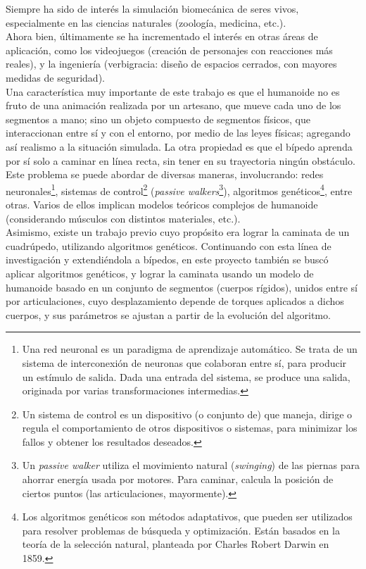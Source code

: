 \documentclass{article}
\begin{document}
Siempre ha sido de inter\'es la simulaci\'on biomec\'anica de seres vivos, especialmente en las ciencias naturales (zoolog\'ia, medicina, etc.). \\
Ahora bien, \'ultimamente se ha incrementado el inter\'es en otras \'areas de aplicaci\'on, como los videojuegos (creaci\'on de personajes con reacciones m\'as reales), y la ingenier\'ia (verbigracia: dise\~no de espacios cerrados, con mayores medidas de seguridad).\\
Una caracter\'istica muy importante de este trabajo es que el humanoide no es fruto de una animaci\'on realizada por un artesano, que mueve cada uno de los segmentos a mano; sino un objeto compuesto de segmentos f\'isicos, que interaccionan entre s\'i y con el entorno, por medio de las leyes f\'isicas; agregando as\'i realismo a la situaci\'on simulada.  La otra propiedad es que el b\'ipedo aprenda por s\'i solo a caminar en l\'inea recta, sin tener en su trayectoria ning\'un obst\'aculo.\\
Este problema se puede abordar de diversas maneras, involucrando: redes neuronales\footnote{Una red neuronal es un paradigma de aprendizaje autom\'atico. Se trata de un sistema de interconexi\'on de neuronas que colaboran entre s\'i, para producir un est\'imulo de salida. Dada una entrada del sistema, se produce una salida, originada por varias transformaciones intermedias.}, sistemas de control\footnote{Un sistema de control es un dispositivo (o conjunto de) que maneja, dirige o regula el comportamiento de otros dispositivos o sistemas, para minimizar los fallos y obtener los resultados deseados.} (\textit{passive walkers}\footnote{Un \textit{passive walker} utiliza el movimiento natural (\textit{swinging}) de las piernas para ahorrar energ\'ia usada por motores. Para caminar, calcula la posici\'on de ciertos puntos (las articulaciones, mayormente).})\cite{Wojtyra}, algoritmos gen\'eticos\footnote{Los algoritmos gen\'eticos son m\'etodos adaptativos, que pueden ser utilizados para resolver problemas de b\'usqueda y optimizaci\'on. Est\'an basados en la teor\'ia de la selecci\'on natural, planteada por Charles Robert Darwin en 1859.}\cite{flexibleMuscle}, entre otras. Varios de ellos implican modelos te\'oricos complejos de humanoide (considerando m\'usculos con distintos materiales, etc.). \\
Asimismo, existe un trabajo previo cuyo prop\'osito era lograr la caminata de un cuadr\'upedo, utilizando algoritmos gen\'eticos\cite{Cuadrupedo}. Continuando con esta l\'inea de investigaci\'on y extendi\'endola a b\'ipedos, en este proyecto tambi\'en se busc\'o aplicar algoritmos gen\'eticos, y lograr la caminata usando un modelo de humanoide basado en un conjunto de segmentos (cuerpos r\'igidos), unidos entre s\'i por articulaciones, cuyo desplazamiento depende de torques aplicados a dichos cuerpos, y sus par\'ametros se ajustan a partir de la evoluci\'on del algoritmo. \\
\end{document}
